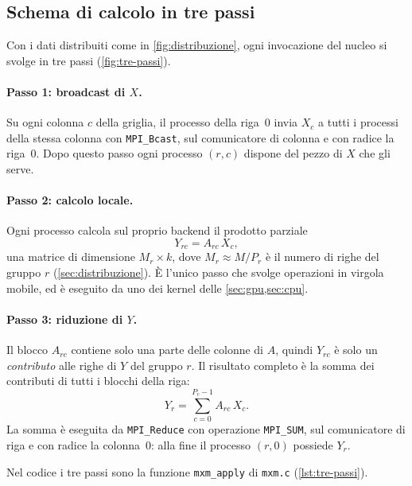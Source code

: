 \documentclass[11pt,a4paper]{article}
\begin{document}
\subsection{Schema di calcolo in tre passi}\label{sec:tre-passi}

Con i dati distribuiti come in \cref{fig:distribuzione}, ogni invocazione del
nucleo si svolge in tre passi (\cref{fig:tre-passi}).

\paragraph{Passo 1: broadcast di $X$.} Su ogni colonna $c$ della griglia, il
processo della riga~0 invia $X_c$ a tutti i processi della stessa colonna con
\texttt{MPI\_Bcast}, sul comunicatore di colonna e con radice la riga~0. Dopo
questo passo ogni processo $(r, c)$ dispone del pezzo di $X$ che gli serve.

\paragraph{Passo 2: calcolo locale.} Ogni processo calcola sul proprio backend
il prodotto parziale
\[
  Y_{rc} = A_{rc}\, X_c ,
\]
una matrice di dimensione $M_r \times k$, dove $M_r \approx M / P_r$ è il
numero di righe del gruppo $r$ (\cref{sec:distribuzione}). È l'unico passo
che svolge operazioni in virgola mobile, ed è eseguito da uno dei kernel delle
\cref{sec:gpu,sec:cpu}.

\paragraph{Passo 3: riduzione di $Y$.} Il blocco $A_{rc}$ contiene solo una
parte delle colonne di $A$, quindi $Y_{rc}$ è solo un \emph{contributo} alle
righe di $Y$ del gruppo $r$. Il risultato completo è la somma dei contributi di
tutti i blocchi della riga:
\[
  Y_r = \sum_{c=0}^{P_c - 1} A_{rc}\, X_c .
\]
La somma è eseguita da \texttt{MPI\_Reduce} con operazione \texttt{MPI\_SUM},
sul comunicatore di riga e con radice la colonna~0: alla fine il processo
$(r, 0)$ possiede $Y_r$.

Nel codice i tre passi sono la funzione \texttt{mxm\_apply} di
\texttt{mxm.c} (\cref{lst:tre-passi}).
\end{document}
